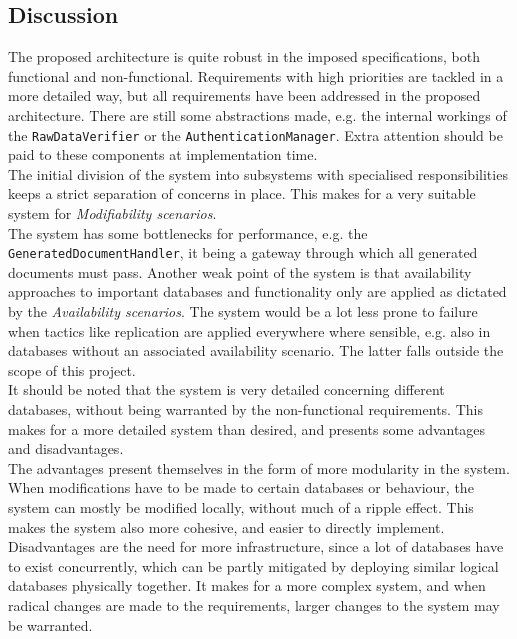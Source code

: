 \subsection{Discussion}
The proposed architecture is quite robust in the imposed specifications, both functional and non-functional. Requirements with high priorities are tackled in a more detailed way, but all requirements have been addressed in the proposed architecture. There are still some abstractions made, e.g. the internal workings of the \texttt{RawDataVerifier} or the \texttt{AuthenticationManager}. Extra attention should be paid to these components at implementation time.\\
The initial division of the system into subsystems with specialised responsibilities keeps a strict separation of concerns in place. This makes for a very suitable system for \emph{Modifiability scenarios}.\\
The system has some bottlenecks for performance, e.g. the \texttt{GeneratedDocumentHandler}, it being a gateway through which all generated documents must pass. Another weak point of the system is that availability approaches to important databases and functionality only are applied as dictated by the \emph{Availability scenarios}. The system would be a lot less prone to failure when tactics like replication are applied everywhere where sensible, e.g. also in databases without an associated availability scenario. The latter falls outside the scope of this project.\\
It should be noted that the system is very detailed concerning different databases, without being warranted by the non-functional requirements. This makes for a more detailed system than desired, and presents some advantages and disadvantages.\\
The advantages present themselves in the form of more modularity in the system. When modifications have to be made to certain databases or behaviour, the system can mostly be modified locally, without much of a ripple effect. This makes the system also more cohesive, and easier to directly implement. Disadvantages are the need for more infrastructure, since a lot of databases have to exist concurrently, which can be partly mitigated by deploying similar logical databases physically together. It makes for a more complex system, and when radical changes are made to the requirements, larger changes to the system may be warranted.
